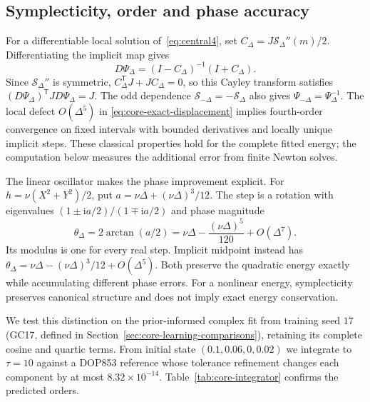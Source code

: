 \subsection{Symplecticity, order and phase accuracy}
\label{sec:core-integrator-analysis}
For a differentiable local solution of~\eqref{eq:central4}, set
$C_\Delta=J\mathcal S_\Delta''(m)/2$. Differentiating the implicit map gives
\begin{equation}
 D\Psi_\Delta=(I-C_\Delta)^{-1}(I+C_\Delta).
 \label{eq:core-step-tangent}
\end{equation}
Since $\mathcal S_\Delta''$ is symmetric,
$C_\Delta^{\mathsf T}J+JC_\Delta=0$, so this Cayley transform satisfies
$(D\Psi_\Delta)^{\mathsf T}JD\Psi_\Delta=J$.
The odd dependence $\mathcal S_{-\Delta}=-\mathcal S_\Delta$ also gives
$\Psi_{-\Delta}=\Psi_\Delta^{-1}$. The local defect $O(\Delta^5)$ in
\eqref{eq:core-exact-displacement} implies fourth-order convergence on
fixed intervals with bounded derivatives and locally unique implicit
steps. These classical properties \citep[Theorems~17--18 and 23--24]{feng}
hold for the complete fitted energy; the computation below measures the
additional error from finite Newton solves.

The linear oscillator makes the phase improvement explicit. For
$h=\nu(X^2+Y^2)/2$, put $a=\nu\Delta+(\nu\Delta)^3/12$.
The step is a rotation with eigenvalues
$(1\pm\mathrm ia/2)/(1\mp\mathrm ia/2)$ and phase magnitude
\begin{equation}
 \theta_\Delta=2\arctan(a/2)
 =\nu\Delta-\frac{(\nu\Delta)^5}{120}+O(\Delta^7).
 \label{eq:core-linear-phase}
\end{equation}
Its modulus is one for every real step. Implicit midpoint instead has
$\theta_\Delta=\nu\Delta-(\nu\Delta)^3/12+O(\Delta^5)$.
Both preserve the quadratic energy exactly while accumulating different
phase errors. For a nonlinear energy, symplecticity preserves canonical
structure and does not imply exact energy conservation.

We test this distinction on the prior-informed complex fit from training
seed $17$ (GC17, defined in Section~\ref{sec:core-learning-comparisons}),
retaining its complete cosine and quartic terms. From initial state
$(0.1,0.06,0,0.02)$ we integrate to $\tau=10$ against a DOP853 reference
whose tolerance refinement changes each component by at most
$8.32\times10^{-14}$. Table~\ref{tab:core-integrator} confirms the
predicted orders.

